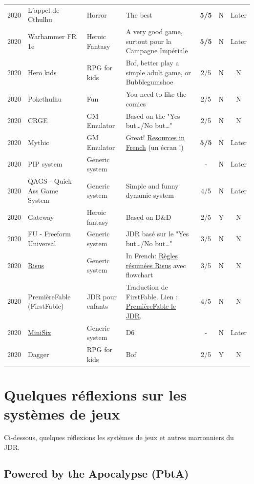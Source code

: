 \documentclass[a4paper, 11pt, twoside]{article}
\begin{document}
\begin{longtable}{cp{2cm}p{1.5cm}p{7cm}ccc}
2020 & L'appel de Cthulhu & Horror & The best & \textbf{5/5} & N & Later\\
2020 & Warhammer FR 1e & Heroic Fantasy & A very good game, surtout pour la Campagne Impériale & \textbf{5/5} & N & Later\\
2020 & Hero kids & RPG for kids & Bof, better play a simple adult game, or Bubblegumshoe & 2/5 & N & N\\
2020 & Pokethulhu & Fun & You need to like the comics & 2/5 & N & N\\
2020 & CRGE & GM Emulator & Based on the "Yes but\ldots{}/No but\ldots{}" & 2/5 & N & N\\
2020 & Mythic & GM Emulator & Great! \href{https://github.com/orey/jdr/tree/master/Mythic-fr}{Resources in French} (un écran !) & \textbf{5/5} & N & Later\\
2020 & PIP system & Generic system &  & - & N & Later\\
2020 & QAGS - Quick Ass Game System & Generic system & Simple and funny dynamic system & 4/5 & N & Later\\
2020 & Gateway & Heroic fantasy & Based on D\&D & 2/5 & Y & N\\
2020 & FU - Freeform Universal & Generic system & JDR basé sur le "Yes but\ldots{}/No but\ldots{}" & 3/5 & N & N\\
2020 & \href{https://github.com/orey/jdr/tree/master/Risus-fr}{Risus} & Generic system & In French:  \href{https://github.com/orey/jdr/tree/master/Risus-fr}{Règles résumées Risus} avec flowchart & 3/5 & N & N\\
2020 & PremièreFable (FirstFable) & JDR pour enfants & Traduction de FirstFable. Lien : \href{https://orey.github.io/premierefable/}{PremièreFable le JDR}. & 4/5 & N & N\\
2020 & \href{https://www.drivethrurpg.com/product/144558/Mini-Six-Bare-Bones-Edition}{MiniSix} & Generic system & D6 & - & N & Later\\
2020 & Dagger & RPG for kids & Bof & 2/5 & Y & N\\
\end{longtable}

\section{Quelques réflexions sur les systèmes de jeux}
\label{sec:orgb4ce5ec}

Ci-dessous, quelques réflexions les systèmes de jeux et autres marronniers du JDR.

\subsection{Powered by the Apocalypse (PbtA)}
\label{sec:orgc0793d1}
\end{document}
